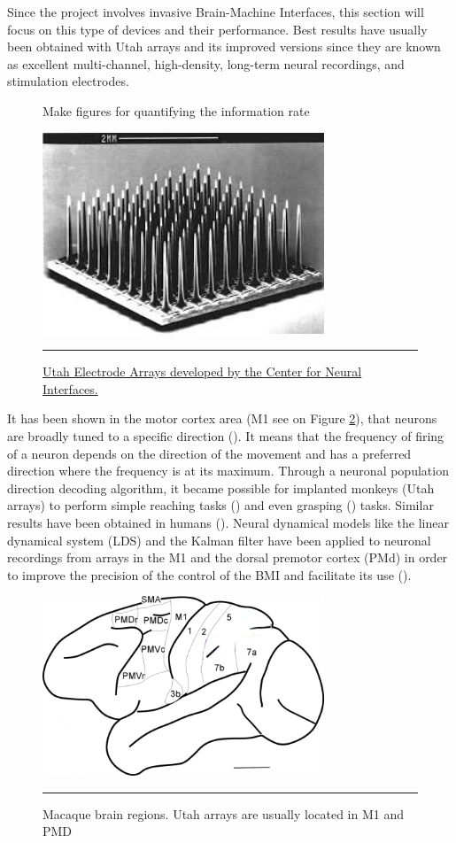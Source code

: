 \documentclass[preprint,12pt]{elsarticle}
\begin{document}
Since the project involves invasive Brain-Machine Interfaces, this section will focus on this type of devices and their performance. Best results have usually been obtained with Utah arrays and its improved versions since they are known as excellent multi-channel, high-density, long-term neural recordings, and stimulation electrodes.
\begin{figure}[htbp]Make figures for quantifying the information rate

\centering
\includegraphics[width=0.75\textwidth]{images/utaharray.jpeg}
\rule{35em}{0.5pt}
\caption[A Utah Array]{\href{http://www.sci.utah.edu/~gk/abstracts/bisti03}{Utah Electrode Arrays developed by the Center for Neural Interfaces.}}
\label{fig:utaharray}
\end{figure}
It has been shown in the motor cortex area (M1 see on Figure \ref{fig:monkeybrainarea}),  that neurons are broadly tuned to a specific direction (\citet{Georgopoulos1986}). It means that the frequency of firing of a neuron depends on the direction of the movement and has a preferred direction where the frequency is at its maximum. Through a neuronal population direction decoding algorithm, it became possible for implanted monkeys (Utah arrays) to perform simple reaching tasks (\citet{Chapin1999}) and even grasping (\citet{Carmena2003}) tasks. Similar results have been obtained in humans (\citet{Hochberg2006}). Neural dynamical models like the linear dynamical system (LDS) and the Kalman filter have been applied to neuronal recordings from arrays in the M1 and the dorsal premotor cortex (PMd) in order to improve the precision of the control of the BMI and facilitate its use (\citet{Kao2015}).
\begin{figure}[htbp]
\centering
\includegraphics[width=0.75\textwidth]{images/monkeybrain.png}
\rule{35em}{0.5pt}
\caption[A monkey brain scheme]{Macaque brain regions. Utah arrays are usually located in M1 and PMD}
\label{fig:monkeybrainarea}
\end{figure}
\end{document}
